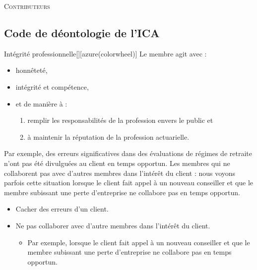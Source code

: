 \documentclass[10pt, french]{article}
\begin{document}
\begin{center}
	\textsc{\Large Contributeurs}\\[0.5cm] 
\end{center}


\newpage

\begin{multicols*}{2} 
\setcounter{secnumdepth}{0}
\section{Code de déontologie de l'ICA}
\begin{definitionGENERAL}{Intégrité professionnelle}[][azure(colorwheel)]
Le membre agit avec : 
\begin{itemize}
	\item	honnêteté, 
	\item	intégrité et compétence, 
	\item	et de manière à : 
		\begin{enumerate}
		\item	remplir les responsabilités de la profession envers le public et 
		\item	à maintenir la réputation de la profession actuarielle.
		\end{enumerate}
\end{itemize}

\bigskip

\begin{rappel_enhanced}
Par exemple, des erreurs significatives dans des évaluations de régimes de retraite n’ont pas été divulguées au client en temps opportun. Les membres qui ne collaborent pas avec d’autres membres dans l’intérêt du client : nous voyons parfois cette situation lorsque le client fait appel à un nouveau conseiller et que le membre subissant une perte d’entreprise ne collabore pas en temps opportun.

\begin{itemize}
	\item	Cacher des erreurs d'un client.
	\item	Ne pas collaborer avec d'autre membres dans l'intérêt du client.
	\begin{itemize}
		\item	Par exemple, lorsque le client fait appel à un nouveau conseiller et que le membre subissant une perte d’entreprise ne collabore pas en temps opportun.
	\end{itemize}
\end{itemize}
\end{rappel_enhanced}
\end{definitionGENERAL}


\end{multicols*}
\end{document}
